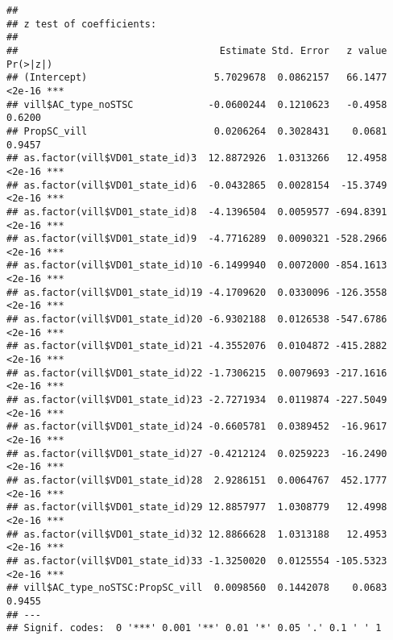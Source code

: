 \documentclass[
]{article}
\newenvironment{Shaded}{\begin{snugshade}}{\end{snugshade}}
\newcommand{\AttributeTok}[1]{\textcolor[rgb]{0.77,0.63,0.00}{#1}}
\newcommand{\CommentTok}[1]{\textcolor[rgb]{0.56,0.35,0.01}{\textit{#1}}}
\newcommand{\DocumentationTok}[1]{\textcolor[rgb]{0.56,0.35,0.01}{\textbf{\textit{#1}}}}
\newcommand{\FunctionTok}[1]{\textcolor[rgb]{0.00,0.00,0.00}{#1}}
\newcommand{\NormalTok}[1]{#1}
\newcommand{\OtherTok}[1]{\textcolor[rgb]{0.56,0.35,0.01}{#1}}
\newcommand{\SpecialCharTok}[1]{\textcolor[rgb]{0.00,0.00,0.00}{#1}}
\newcommand{\StringTok}[1]{\textcolor[rgb]{0.31,0.60,0.02}{#1}}
\begin{document}
\begin{Shaded}
\end{Shaded}

\begin{verbatim}
## 
## z test of coefficients:
## 
##                                   Estimate Std. Error   z value Pr(>|z|)    
## (Intercept)                      5.7029678  0.0862157   66.1477   <2e-16 ***
## vill$AC_type_noSTSC             -0.0600244  0.1210623   -0.4958   0.6200    
## PropSC_vill                      0.0206264  0.3028431    0.0681   0.9457    
## as.factor(vill$VD01_state_id)3  12.8872926  1.0313266   12.4958   <2e-16 ***
## as.factor(vill$VD01_state_id)6  -0.0432865  0.0028154  -15.3749   <2e-16 ***
## as.factor(vill$VD01_state_id)8  -4.1396504  0.0059577 -694.8391   <2e-16 ***
## as.factor(vill$VD01_state_id)9  -4.7716289  0.0090321 -528.2966   <2e-16 ***
## as.factor(vill$VD01_state_id)10 -6.1499940  0.0072000 -854.1613   <2e-16 ***
## as.factor(vill$VD01_state_id)19 -4.1709620  0.0330096 -126.3558   <2e-16 ***
## as.factor(vill$VD01_state_id)20 -6.9302188  0.0126538 -547.6786   <2e-16 ***
## as.factor(vill$VD01_state_id)21 -4.3552076  0.0104872 -415.2882   <2e-16 ***
## as.factor(vill$VD01_state_id)22 -1.7306215  0.0079693 -217.1616   <2e-16 ***
## as.factor(vill$VD01_state_id)23 -2.7271934  0.0119874 -227.5049   <2e-16 ***
## as.factor(vill$VD01_state_id)24 -0.6605781  0.0389452  -16.9617   <2e-16 ***
## as.factor(vill$VD01_state_id)27 -0.4212124  0.0259223  -16.2490   <2e-16 ***
## as.factor(vill$VD01_state_id)28  2.9286151  0.0064767  452.1777   <2e-16 ***
## as.factor(vill$VD01_state_id)29 12.8857977  1.0308779   12.4998   <2e-16 ***
## as.factor(vill$VD01_state_id)32 12.8866628  1.0313188   12.4953   <2e-16 ***
## as.factor(vill$VD01_state_id)33 -1.3250020  0.0125554 -105.5323   <2e-16 ***
## vill$AC_type_noSTSC:PropSC_vill  0.0098560  0.1442078    0.0683   0.9455    
## ---
## Signif. codes:  0 '***' 0.001 '**' 0.01 '*' 0.05 '.' 0.1 ' ' 1
\end{verbatim}
\end{document}
